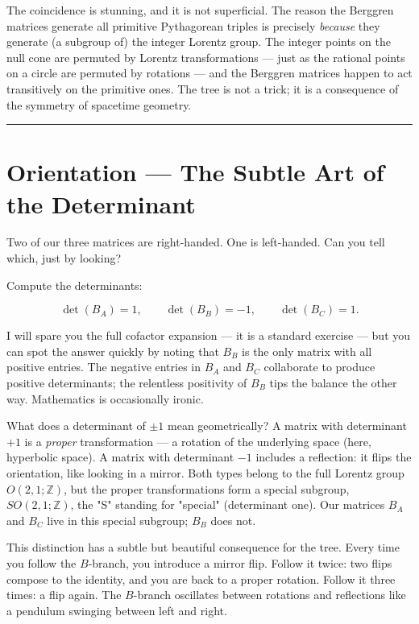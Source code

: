 \documentclass[12pt, letterpaper, openany]{book}
\theoremstyle{definition}
\theoremstyle{remark}
\begin{document}
The coincidence is stunning, and it is not superficial. The reason the Berggren matrices generate all primitive Pythagorean triples is precisely \textit{because} they generate (a subgroup of) the integer Lorentz group. The integer points on the null cone are permuted by Lorentz transformations --- just as the rational points on a circle are permuted by rotations --- and the Berggren matrices happen to act transitively on the primitive ones. The tree is not a trick; it is a consequence of the symmetry of spacetime geometry.


\bigskip\noindent\rule{\textwidth}{0.4pt}\bigskip



\section*{Orientation --- The Subtle Art of the Determinant}


Two of our three matrices are right-handed. One is left-handed. Can you tell which, just by looking?

Compute the determinants:

\[
\det(B_A) = 1, \qquad \det(B_B) = -1, \qquad \det(B_C) = 1.
\]

I will spare you the full cofactor expansion --- it is a standard exercise --- but you can spot the answer quickly by noting that $B_B$ is the only matrix with all positive entries. The negative entries in $B_A$ and $B_C$ collaborate to produce positive determinants; the relentless positivity of $B_B$ tips the balance the other way. Mathematics is occasionally ironic.

What does a determinant of $\pm 1$ mean geometrically? A matrix with determinant $+1$ is a \textit{proper} transformation --- a rotation of the underlying space (here, hyperbolic space). A matrix with determinant $-1$ includes a reflection: it flips the orientation, like looking in a mirror. Both types belong to the full Lorentz group $O(2, 1; \mathbb{Z})$, but the proper transformations form a special subgroup, $SO(2, 1; \mathbb{Z})$, the "S" standing for "special" (determinant one). Our matrices $B_A$ and $B_C$ live in this special subgroup; $B_B$ does not.

This distinction has a subtle but beautiful consequence for the tree. Every time you follow the $B$-branch, you introduce a mirror flip. Follow it twice: two flips compose to the identity, and you are back to a proper rotation. Follow it three times: a flip again. The $B$-branch oscillates between rotations and reflections like a pendulum swinging between left and right.
\end{document}
